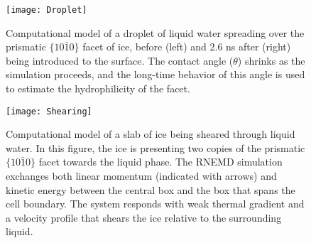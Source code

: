 \documentclass[aps,jcp,preprint,showpacs,superscriptaddress,groupedaddress]{revtex4}  %
\begin{document}




\newpage
\begin{figure}
\texttt{[image: Droplet]}
\caption{\label{fig:Droplet} Computational model of a droplet of
  liquid water spreading over the prismatic $\{10\bar{1}0\}$ facet
  of ice, before (left) and 2.6 ns after (right) being introduced to the
  surface.  The contact angle ($\theta$) shrinks as the simulation
  proceeds, and the long-time behavior of this angle is used to
  estimate the hydrophilicity of the facet.}
\end{figure}
\newpage
\begin{figure}
\texttt{[image: Shearing]}
\caption{\label{fig:Shearing} Computational model of a slab of ice
  being sheared through liquid water.  In this figure, the ice is
  presenting two copies of the prismatic $\{10\bar{1}0\}$ facet
  towards the liquid phase.  The RNEMD simulation exchanges both
  linear momentum (indicated with arrows) and kinetic energy between
  the central box and the box that spans the cell boundary.  The
  system responds with weak thermal gradient and a velocity profile
  that shears the ice relative to the surrounding liquid.}
\end{figure}
\end{document}
